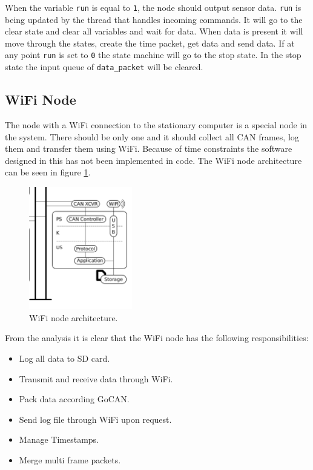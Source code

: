 When the variable \texttt{run} is equal to \texttt{1}, the node should output sensor data.
\texttt{run} is being updated by the thread that handles incoming commands.
It will go to the clear state and clear all variables and wait for data. 
When data is present it will move through the states, create the time packet, get data and send data. 
If at any point \texttt{run} is set to \texttt{0} the state machine will go to the stop state.
In the stop state the input queue of \texttt{data\_packet} will be cleared.


\subsection{WiFi Node}\label{sec:somewifinodesection}
The node with a WiFi connection to the stationary computer is a special node in the system.
There should be only one and it should collect all CAN frames, log them and transfer them using WiFi.
Because of time constraints the software designed in this has not been implemented in code.
The WiFi node architecture can be seen in figure \ref{fig:wifi_node}.

\begin{figure}[!h]
\centering
\includegraphics[width=0.4\textwidth]{graphics/wifi_node}
\caption{WiFi node architecture.}
\label{fig:wifi_node}
\end{figure}

From the analysis it is clear that the WiFi node has the following responsibilities:

\begin{itemize}
\item Log all data to SD card.
\item Transmit and receive data through WiFi.
\item Pack data according GoCAN.
\item Send log file through WiFi upon request.
\item Manage Timestamps.
\item Merge multi frame packets.
\end{itemize}


